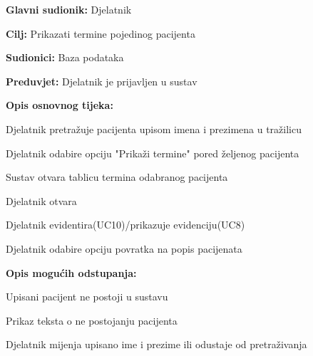 				\noindent {}
				\begin{packed_item}
					
					\item \textbf{Glavni sudionik: }Djelatnik
					\item  \textbf{Cilj: }Prikazati termine pojedinog pacijenta 
					\item  \textbf{Sudionici: }Baza podataka
					\item  \textbf{Preduvjet: }Djelatnik je prijavljen u sustav
				
					\item  \textbf{Opis osnovnog tijeka: }
					
					\item[] \begin{packed_enum}
						
						\item Djelatnik pretražuje pacijenta upisom imena i prezimena u tražilicu
						\item Djelatnik odabire opciju "Prikaži termine" pored željenog pacijenta
						\item Sustav otvara tablicu termina odabranog pacijenta
						\item Djelatnik otvara 
						\item Djelatnik evidentira(UC10)/prikazuje evidenciju(UC8)
						\item Djelatnik odabire opciju povratka na popis pacijenata
					\end{packed_enum}
					
					\item  \textbf{Opis mogućih odstupanja:}
					
					\item[] \begin{packed_item}
						
						\item[1.a] Upisani pacijent ne postoji u sustavu
						\item[] \begin{packed_enum}
							\item Prikaz teksta o ne postojanju pacijenta
							\item Djelatnik mijenja upisano ime i prezime ili odustaje od pretraživanja
							
						\end{packed_enum}
						
					\end{packed_item}
					\item[] \begin{packed_item}
						

\end{packed_item}
\end{packed_item}
